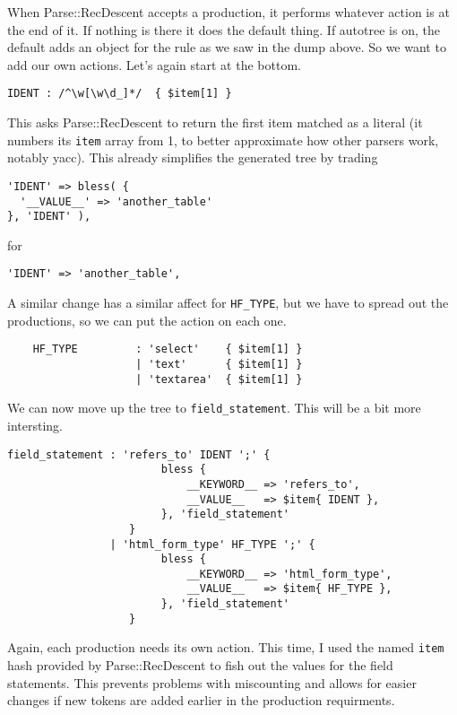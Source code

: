 When Parse::RecDescent accepts a production, it performs whatever action
is at the end of it.  If nothing is there it does the default thing.  If
autotree is on, the default adds an object for the rule as we saw in the dump
above.  So we want to add our own actions.  Let's again start at the bottom.

\begin{verbatim}
IDENT : /^\w[\w\d_]*/  { $item[1] }
\end{verbatim}

This asks Parse::RecDescent to return the first item matched as a literal
(it numbers its \verb+item+ array from 1, to better approximate how other
parsers work, notably yacc).  This already simplifies the generated tree by
trading

\begin{verbatim}
'IDENT' => bless( {
  '__VALUE__' => 'another_table'
}, 'IDENT' ),
\end{verbatim}

for

\begin{verbatim}
'IDENT' => 'another_table',
\end{verbatim}

A similar change has a similar affect for \verb+HF_TYPE+, but we have
to spread out the productions, so we can put the action on each one.

\begin{verbatim}
    HF_TYPE         : 'select'    { $item[1] }
                    | 'text'      { $item[1] }
                    | 'textarea'  { $item[1] }
\end{verbatim}

We can now move up the tree to \verb+field_statement+.  This will be
a bit more intersting.

\begin{verbatim}
field_statement : 'refers_to' IDENT ';' {
                        bless {
                            __KEYWORD__ => 'refers_to',
                            __VALUE__   => $item{ IDENT },
                        }, 'field_statement'
                   }
                | 'html_form_type' HF_TYPE ';' {
                        bless {
                            __KEYWORD__ => 'html_form_type',
                            __VALUE__   => $item{ HF_TYPE },
                        }, 'field_statement'
                   }
\end{verbatim}

Again, each production needs its own action.  This time, I used the
named \verb+item+ hash provided by Parse::RecDescent to fish out the values
for the field statements.  This prevents problems with miscounting and
allows for easier changes if new tokens are added earlier in the production
requirments.

